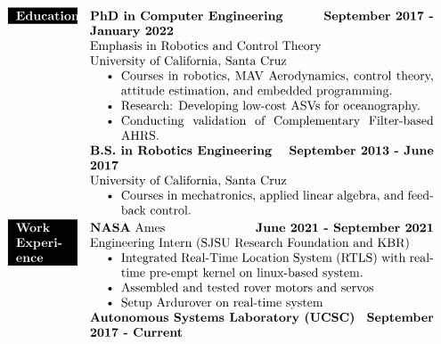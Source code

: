 \documentclass[paper=a4,fontsize=11pt]{article} %
\def \mainColWidth {0.8\textwidth}		%
\def \leftColWidth {0.125\textwidth}		%
\begin{document}
\begin{align*}
		\colorbox{black}{\color{white}{
			\parbox[t]{\leftColWidth}{%
				\textbf{Education}}
			}%
		}
		& &
		\parbox[t]{\mainColWidth}{%
			\textbf{PhD in Computer Engineering} \hfill \textbf{September 2017 - January 2022} \\
			Emphasis in Robotics and Control Theory\\
			University of California, Santa Cruz
			\begin{itemize}[noitemsep,topsep=0pt]
			\item Courses in robotics, MAV Aerodynamics, control theory, attitude estimation, and embedded programming.
			\item Research: Developing low-cost ASVs for oceanography. 
			\item Conducting validation of Complementary Filter-based AHRS.
			\end{itemize}
			\textbf{B.S. in Robotics Engineering} \hfill \textbf{September 2013 - June 2017}\\
			University of California, Santa Cruz
			\begin{itemize}[noitemsep,topsep=0pt]
			\item Courses in mechatronics, applied linear algebra, and feedback control.
			\end{itemize}
		}%
	\\
		\colorbox{black}{\color{white}{
				\parbox[t]{\leftColWidth}{%
					\textbf{Work Experience}}
			}%
		}
		& &
		\parbox[t]{\mainColWidth}{%
			\textbf{NASA} Ames \hfill \textbf{June 2021 - September 2021}\\
			\quad Engineering Intern (SJSU Research Foundation and KBR)
			\begin{itemize}[noitemsep,topsep=0pt]
				\item Integrated Real-Time Location System (RTLS) with real-time pre-empt kernel on linux-based system.
				\item Assembled and tested rover motors and servos
				\item Setup Ardurover on real-time system 
			\end{itemize}
			\textbf{Autonomous Systems Laboratory (UCSC)} \hfill \textbf{September 2017 - Current}\\
}
\end{align*}
\end{document}

